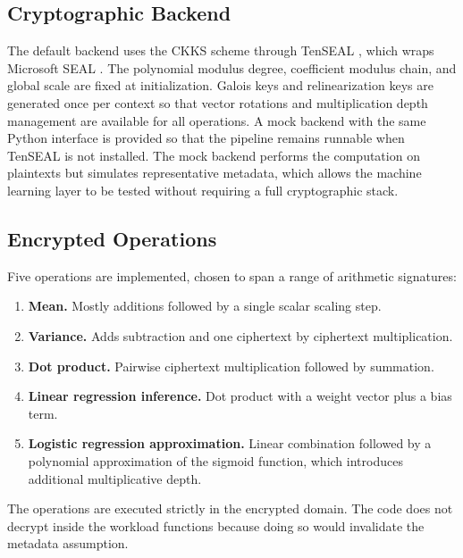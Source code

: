 \documentclass[12pt,a4paper]{article}
\begin{document}

\subsection{Cryptographic Backend}
The default backend uses the CKKS scheme through TenSEAL \cite{benaissa2021tenseal}, which wraps Microsoft SEAL \cite{sealcrypto}. The polynomial modulus degree, coefficient modulus chain, and global scale are fixed at initialization. Galois keys and relinearization keys are generated once per context so that vector rotations and multiplication depth management are available for all operations. A mock backend with the same Python interface is provided so that the pipeline remains runnable when TenSEAL is not installed. The mock backend performs the computation on plaintexts but simulates representative metadata, which allows the machine learning layer to be tested without requiring a full cryptographic stack.

\subsection{Encrypted Operations}
Five operations are implemented, chosen to span a range of arithmetic signatures:
\begin{enumerate}[leftmargin=*]
  \item \textbf{Mean.} Mostly additions followed by a single scalar scaling step.
  \item \textbf{Variance.} Adds subtraction and one ciphertext by ciphertext multiplication.
  \item \textbf{Dot product.} Pairwise ciphertext multiplication followed by summation.
  \item \textbf{Linear regression inference.} Dot product with a weight vector plus a bias term.
  \item \textbf{Logistic regression approximation.} Linear combination followed by a polynomial approximation of the sigmoid function, which introduces additional multiplicative depth.
\end{enumerate}
The operations are executed strictly in the encrypted domain. The code does not decrypt inside the workload functions because doing so would invalidate the metadata assumption.
\end{document}
